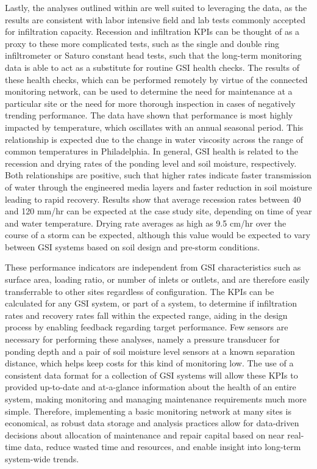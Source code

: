 Lastly, the analyses outlined within are well suited to leveraging the data, as the results are consistent with labor intensive field and lab tests commonly accepted for infiltration capacity.
Recession and infiltration KPIs can be thought of as a proxy to these more complicated tests, such as the single and double ring infiltrometer or Saturo constant head tests, such that the long-term monitoring data is able to act as a substitute for routine GSI health checks.
The results of these health checks, which can be performed remotely by virtue of the connected monitoring network, can be used to determine the need for maintenance at a particular site or the need for more thorough inspection in cases of negatively trending performance.
The data have shown that performance is most highly impacted by temperature, which oscillates with an annual seasonal period.
This relationship is expected due to the change in water viscosity across the range of common temperatures in Philadelphia.
In general, GSI health is related to the recession and drying rates of the ponding level and soil moisture, respectively.
Both relationships are positive, such that higher rates indicate faster transmission of water through the engineered media layers and faster reduction in soil moisture leading to rapid recovery.
Results show that average recession rates between 40 and 120 mm/hr can be expected at the case study site, depending on time of year and water temperature.
Drying rate averages as high as 9.5 cm/hr over the course of a storm can be expected, although this value would be expected to vary between GSI systems based on soil design and pre-storm conditions.

These performance indicators are independent from GSI characteristics such as surface area, loading ratio, or number of inlets or outlets, and are therefore easily transferrable to other sites regardless of configuration.
The KPIs can be calculated for any GSI system, or part of a system, to determine if infiltration rates and recovery rates fall within the expected range, aiding in the design process by enabling feedback regarding target performance.
Few sensors are necessary for performing these analyses, namely a pressure transducer for ponding depth and a pair of soil moisture level sensors at a known separation distance, which helps keep costs for this kind of monitoring low.
The use of a consistent data format for a collection of GSI systems will allow these KPIs to provided up-to-date and at-a-glance information about the health of an entire system, making monitoring and managing maintenance requirements much more simple.
Therefore, implementing a basic monitoring network at many sites is economical, as robust data storage and analysis practices allow for data-driven decisions about allocation of maintenance and repair capital based on near real-time data, reduce wasted time and resources, and enable insight into long-term system-wide trends.